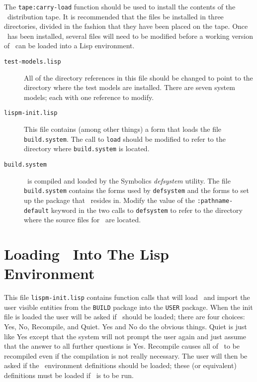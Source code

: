 The {\tt tape:carry-load} function should be used to install the contents of
the \build\ distribution tape.  It is recommended that the files be installed
in three directories, divided in the fashion that they have been placed on 
the tape.  
Once \build\ has been installed, several files will need to be modified
before a working version of \build\ can be loaded into a Lisp environment.
\begin{description}

\item[\tt test-models.lisp]  All of the directory references in this file
should be changed to point to the directory where the test models are installed.
There are seven system models; each with one reference to modify.

\item[\tt lispm-init.lisp]  This file contains (among other things) a 
form that loads the file {\tt build.system}.  The call to {\tt load} should
be modified to refer to the directory where {\tt build.system} is located.

\item[\tt build.system]  \build\ is compiled and loaded by the Symbolics
{\em defsystem} utility.  The file {\tt build.system}
contains the forms used by {\tt defsystem} and the forms to set up the package
that \build\ resides in.  Modify the value of the {\tt :pathname-default}
keyword in the two calls to {\tt defsystem} to refer to the
directory where the source files for \build\ are located.

\end{description}

\section{Loading \build\ Into The Lisp Environment}

This file {\tt lispm-init.lisp} contains function calls that will
load \build\ and import the user visible entities from the {\tt BUILD} package
into the {\tt USER} package.  When the init file is loaded the user will be
asked if \build\ should be loaded; there are four choices: Yes, No, Recompile,
and Quiet.
Yes and No do the obvious things.  Quiet is just like Yes except that the system
will not prompt the user again and just assume that the answer to all further
questions is Yes.  Recompile causes all of \build\ to be recompiled even if
the compilation is not really necessary.
The user will then be asked if the \build\ environment definitions should
be loaded;  these (or equivalent) definitions must be loaded if \build\
is to be run.


